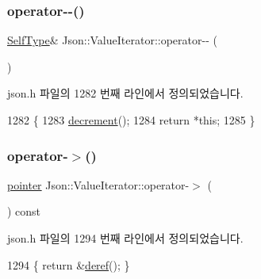 \subsubsection{\texorpdfstring{operator-\/-\/()}{operator--()}\hspace{0.1cm}{\footnotesize\ttfamily [2/2]}}
{\footnotesize\ttfamily \hyperlink{class_json_1_1_value_iterator_base_a9d2a940d03ea06d20d972f41a89149ee}{Self\+Type}\& Json\+::\+Value\+Iterator\+::operator-\/-\/ (\begin{DoxyParamCaption}{ }\end{DoxyParamCaption})\hspace{0.3cm}{\ttfamily [inline]}}



json.\+h 파일의 1282 번째 라인에서 정의되었습니다.


\begin{DoxyCode}
1282                          \{
1283     \hyperlink{class_json_1_1_value_iterator_base_affc8cf5ff54a9f432cc693362c153fa6}{decrement}();
1284     \textcolor{keywordflow}{return} *\textcolor{keyword}{this};
1285   \}
\end{DoxyCode}
\mbox{\label{class_json_1_1_value_iterator_a8dfc1603f92467591d524d0326f35534}} 
\subsubsection{\texorpdfstring{operator-\/$>$()}{operator->()}}
{\footnotesize\ttfamily \hyperlink{class_json_1_1_value_iterator_acec45feb1ef1f3bf81240157d06d5432}{pointer} Json\+::\+Value\+Iterator\+::operator-\/$>$ (\begin{DoxyParamCaption}{ }\end{DoxyParamCaption}) const\hspace{0.3cm}{\ttfamily [inline]}}



json.\+h 파일의 1294 번째 라인에서 정의되었습니다.


\begin{DoxyCode}
1294 \{ \textcolor{keywordflow}{return} &\hyperlink{class_json_1_1_value_iterator_base_aa5b75c9514a30ba2ea3c9a35c165c18e}{deref}(); \}
\end{DoxyCode}
\mbox{\label{class_json_1_1_value_iterator_a8e23312b1db874f7e403fd7e76611bdc}} 
